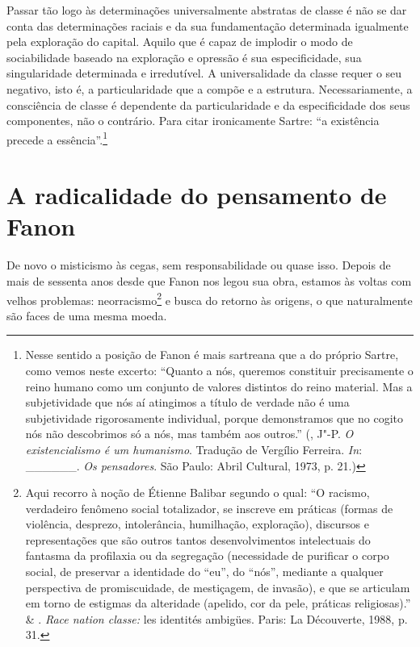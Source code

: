 Passar tão logo às determinações universalmente abstratas de classe é
não se dar conta das determinações raciais e da sua fundamentação
determinada igualmente pela exploração do capital. Aquilo que é capaz de
implodir o modo de sociabilidade baseado na exploração e opressão é sua
especificidade, sua singularidade determinada e irredutível. A
universalidade da classe requer o seu negativo, isto é, a
particularidade que a compõe e a estrutura. Necessariamente, a
consciência de classe é dependente da particularidade e da
especificidade dos seus componentes, não o contrário. Para citar
ironicamente Sartre: ``a existência precede a essência''.\footnote{Nesse
  sentido a posição de Fanon é mais sartreana que a do próprio Sartre,
  como vemos neste excerto: ``Quanto a nós, queremos constituir
  precisamente o reino humano como um conjunto de valores distintos do
  reino material. Mas a subjetividade que nós aí atingimos a título de
  verdade não é uma subjetividade rigorosamente individual, porque
  demonstramos que no cogito nós não descobrimos só a nós, mas também
  aos outros.'' (, J"-P. \emph{O existencialismo é um humanismo}.
  Tradução de Vergílio Ferreira. \emph{In}: \_\_\_\_\_\_. \emph{Os
  pensadores}. São Paulo: Abril Cultural, 1973, p. 21.)}

\chapter{A radicalidade do pensamento de Fanon}

De novo o misticismo às cegas, sem responsabilidade ou quase isso.
Depois de mais de sessenta anos desde que Fanon nos legou sua obra,
estamos às voltas com velhos problemas: neorracismo\footnote{Aqui
  recorro à noção de Étienne Balibar segundo o qual: ``O racismo,
  verdadeiro fenômeno social totalizador, se inscreve em práticas
  (formas de violência, desprezo, intolerância, humilhação, exploração),
  discursos e representações que são outros tantos desenvolvimentos
  intelectuais do fantasma da profilaxia ou da segregação (necessidade
  de purificar o corpo social, de preservar a identidade do ``eu'', do
  ``nós'', mediante a qualquer perspectiva de promiscuidade, de
  mestiçagem, de invasão), e que se articulam em torno de estigmas da
  alteridade (apelido, cor da pele, práticas religiosas).''  \&
  . \emph{Race nation classe:} les identités ambigües.
  Paris: La Découverte, 1988, p. 31.} e busca do retorno às origens, o
que naturalmente são faces de uma mesma moeda.

